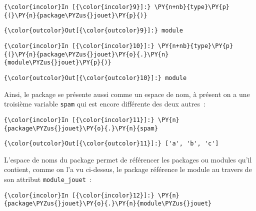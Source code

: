     \begin{Verbatim}[commandchars=\\\{\}]
{\color{incolor}In [{\color{incolor}9}]:} \PY{n+nb}{type}\PY{p}{(}\PY{n}{package\PYZus{}jouet}\PY{p}{)}
\end{Verbatim}


\begin{Verbatim}[commandchars=\\\{\}]
{\color{outcolor}Out[{\color{outcolor}9}]:} module
\end{Verbatim}
            
    \begin{Verbatim}[commandchars=\\\{\}]
{\color{incolor}In [{\color{incolor}10}]:} \PY{n+nb}{type}\PY{p}{(}\PY{n}{package\PYZus{}jouet}\PY{o}{.}\PY{n}{module\PYZus{}jouet}\PY{p}{)}
\end{Verbatim}


\begin{Verbatim}[commandchars=\\\{\}]
{\color{outcolor}Out[{\color{outcolor}10}]:} module
\end{Verbatim}
            
    Ainsi, le package se présente aussi comme un espace de nom, à présent on
a une troisième variable \texttt{spam} qui est encore différente des
deux autres~:

    \begin{Verbatim}[commandchars=\\\{\}]
{\color{incolor}In [{\color{incolor}11}]:} \PY{n}{package\PYZus{}jouet}\PY{o}{.}\PY{n}{spam}
\end{Verbatim}


\begin{Verbatim}[commandchars=\\\{\}]
{\color{outcolor}Out[{\color{outcolor}11}]:} ['a', 'b', 'c']
\end{Verbatim}
            
    L'espace de noms du package permet de référencer les packages ou modules
qu'il contient, comme on l'a vu ci-dessus, le package référence le
module au travers de son attribut \texttt{module\_jouet}~:

    \begin{Verbatim}[commandchars=\\\{\}]
{\color{incolor}In [{\color{incolor}12}]:} \PY{n}{package\PYZus{}jouet}\PY{o}{.}\PY{n}{module\PYZus{}jouet}
\end{Verbatim}


